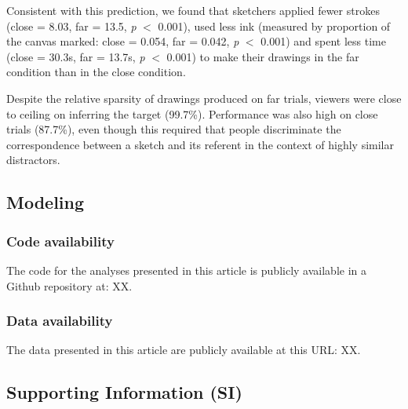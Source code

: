 \documentclass[9pt,twocolumn,twoside]{pnas-new}
\begin{document}
Consistent with this prediction, we found that sketchers applied fewer strokes (close = 8.03, far = 13.5, \textit{p} $<$ 0.001), used less ink (measured by proportion of the canvas marked: close = 0.054, far = 0.042, \textit{p} $<$ 0.001) and spent less time (close = 30.3s, far = 13.7s, \textit{p} $<$ 0.001) to make their drawings in the far condition than in the close condition. 

Despite the relative sparsity of drawings produced on far trials, viewers were close to ceiling on inferring the target (99.7\%). Performance was also high on close trials (87.7\%), even though this required that people discriminate the correspondence between a sketch and its referent in the context of highly similar distractors. 

\subsection*{Modeling}


\subsubsection*{Code availability} The code for the analyses presented in this article is publicly available in a Github repository at: XX.

\subsubsection*{Data availability} The data presented in this article are publicly available at this URL: XX.

\subsection*{Supporting Information (SI)}

\end{document}
